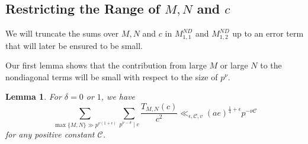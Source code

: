 \documentclass[12pt]{amsart}
\theoremstyle{plain}
\newtheorem{lem}{Lemma}[subsection]
\theoremstyle{definition}
\begin{document}

\subsection{Restricting the Range of $M, N$ and $c$}

We will truncate the sums over $M, N$ and $c$ in $M^{ND}_{1, 1}$ and $M^{ND}_{1, 2}$ up to an error term that will later be ensured to be small.

Our first lemma shows that the contribution from large $M$ or large $N$ to the nondiagonal terms will be small with respect to the size of $p^\nu$.


\begin{lem}\label{restrict M N}
For $\delta=0$ or $1$, we have 
    \[
    \sum_{\max\{M, N\} \gg p^{\nu(1+\epsilon)} }
    \sum_{p^{\nu-\delta} \mid c} \frac{T_{M, N}(c) }{c^2} 
    \ll_{\epsilon, \mathcal{C}, v} (ae)^{\frac14+\epsilon}  p^{-\nu \mathcal{C}}
    \]
for any positive constant $\mathcal{C}$. 
\end{lem}

\end{document}

